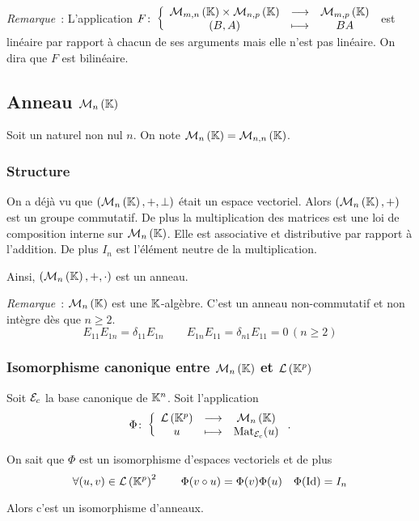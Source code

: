 \emph{Remarque}~: L'application \(F\colon \left\{\begin{array}{ccc} \mathcal{M}_{m,n}\left(\mathbb{K}\right)\times \mathcal{M}_{n,p}\left(\mathbb{K}\right) & \longrightarrow &\mathcal{M}_{m,p}\left(\mathbb{K}\right)\\ (B,A) & \longmapsto & BA \end{array} \right.\) est linéaire par rapport à chacun de ses arguments mais elle n'est pas linéaire. On dira que \(F\) est bilinéaire.

\subsection{Anneau \(\mathcal{M}_{n}\left(\mathbb{K}\right)\)}

Soit un naturel non nul \(n\). On note \(\mathcal{M}_{n}\left(\mathbb{K}\right)=\mathcal{M}_{n,n}\left(\mathbb{K}\right)\).

\subsubsection{Structure}

On a déjà vu que \((\mathcal{M}_{n}\left(\mathbb{K}\right),+,\perp)\) était un espace vectoriel. Alors \((\mathcal{M}_{n}\left(\mathbb{K}\right),+)\) est un groupe commutatif. De plus la multiplication des matrices est une loi de composition interne sur \(\mathcal{M}_{n}\left(\mathbb{K}\right)\). Elle est associative et distributive par rapport à l'addition. De plus \(I_n\) est l'élément neutre de la multiplication.

Ainsi, \((\mathcal{M}_{n}\left(\mathbb{K}\right),+,\cdot)\) est un anneau.

\emph{Remarque}~: \(\mathcal{M}_{n}\left(\mathbb{K}\right)\) est une \(\mathbb{K}\)-algèbre. C'est un anneau non-commutatif et non intègre dès que \(n\geqslant 2\).
\begin{equation}
  E_{11}E_{1n}=\delta_{11}E_{1n} \qquad E_{1n}E_{11}=\delta_{n1}E_{11}=0 \, (n\geqslant 2)
\end{equation}

\subsubsection{Isomorphisme canonique entre \(\mathcal{M}_{n}\left(\mathbb{K}\right)\) et \(\mathcal{L}\left(\mathbb{K}^p\right)\)}

Soit \(\mathcal{E}_c\) la base canonique de \(\mathbb{K}^n\). Soit l'application
\begin{equation}
  \Phi\colon \left\{\begin{array}{ccc} \mathcal{L}\left(\mathbb{K}^p\right) & \longrightarrow &\mathcal{M}_{n}\left(\mathbb{K}\right)\\ u & \longmapsto & \mathrm{Mat}_{\mathcal{E}_c}(u) \end{array} \right..
\end{equation}

On sait que \(\Phi\) est un isomorphisme d'espaces vectoriels et de plus
\begin{equation}
  \forall (u,v) \in \mathcal{L}\left(\mathbb{K}^p\right)^2 \qquad \Phi(v \circ u) =\Phi(v) \Phi(u) \quad \Phi(\operatorname{Id})=I_n
\end{equation}

Alors c'est un isomorphisme d'anneaux.

